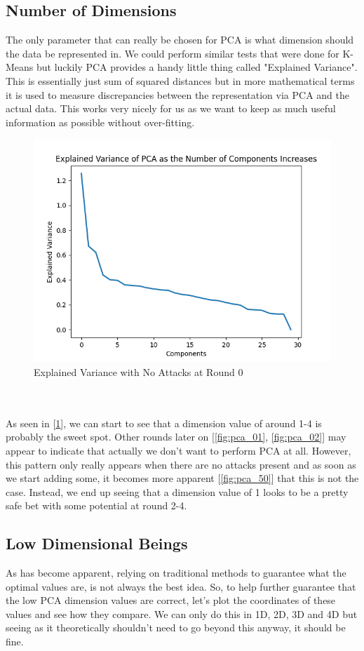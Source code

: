 \subsection{Number of Dimensions}
The only parameter that can really be chosen for PCA is what dimension should the data be represented in.
We could perform similar tests that were done for K-Means but luckily PCA provides a handy little thing called "Explained Variance".
This is essentially just sum of squared distances but in more mathematical terms it is used to measure discrepancies between the representation via PCA and the actual data.
This works very nicely for us as we want to keep as much useful information as possible without over-fitting.
\begin{figure}[htbp]
	\centering
    \includegraphics[scale=0.5]{my_agg/graphs/0_r0.png}
	\caption{Explained Variance with No Attacks at Round 0}
	\label{fig:pca_00}
\end{figure}
\\ \\
As seen in [\ref{fig:pca_00}], we can start to see that a dimension value of around 1-4 is probably the sweet spot.
Other rounds later on [\ref{fig:pca_01}, \ref{fig:pca_02}] may appear to indicate that actually we don't want to perform PCA at all.
However, this pattern only really appears when there are no attacks present and as soon as we start adding some, it becomes more apparent [\ref{fig:pca_50}] that this is not the case.
Instead, we end up seeing that a dimension value of 1 looks to be a pretty safe bet with some potential at round 2-4.


\subsection{Low Dimensional Beings}
As has become apparent, relying on traditional methods to guarantee what the optimal values are, is not always the best idea.
So, to help further guarantee that the low PCA dimension values are correct, let's plot the coordinates of these values and see how they compare.
We can only do this in 1D, 2D, 3D and 4D but seeing as it theoretically shouldn't need to go beyond this anyway, it should be fine.
\\ \\





